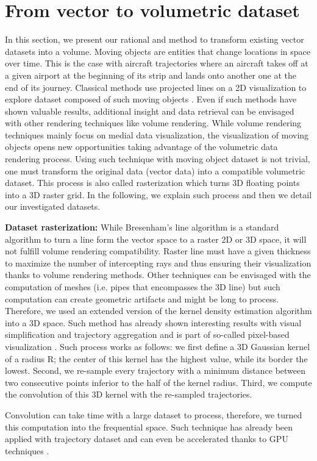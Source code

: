 \section{From vector to volumetric dataset}


In this section, we present our rational and method to transform existing vector datasets into a volume. 
Moving objects are entities that change locations in space over time. This is the case with aircraft trajectories where an aircraft takes off at a given airport at the beginning of its strip and lands onto another one at the end of its journey. Classical methods use projected lines on a 2D visualization to explore dataset composed of such moving objects \cite{hurter2014interactive}. Even if such methods have shown valuable results, additional insight and data retrieval can be envisaged with other rendering techniques like volume rendering. While volume rendering techniques mainly focus on medial data visualization, the visualization of moving objects opens new opportunities taking advantage of the volumetric data rendering process.  Using such technique with moving object dataset is not trivial, one must transform the original data (vector data) into a compatible volumetric dataset. This process is also called rasterization which turns 3D floating points into a 3D raster grid. In the following, we explain such process and then we detail our investigated datasets.

\textbf{Dataset rasterization:} While Bresenham's line algorithm is a standard algorithm to turn a line form the vector space to a raster 2D or 3D space, it will not fulfill volume rendering compatibility. Raster line must have a given thickness to maximize the number of intercepting rays and thus ensuring their visualization thanks to volume rendering methods. Other techniques can be envisaged with the computation of meshes (i.e. pipes that encompasses the 3D line) but such computation can create geometric artifacts and might be long to process. Therefore, we used an extended version of the kernel density estimation algorithm \cite{ silverman1986density} into a 3D space. Such method has already shown interesting results with visual simplification and trajectory aggregation \cite{hurter2012graph} and is part of so-called pixel-based visualization \cite{hurter2015image}.
Such process works as follows: we first define a 3D Gaussian kernel of a radius R; the center of this kernel has the highest value, while its border the lowest. Second, we re-sample every trajectory with a minimum distance between two consecutive points inferior to the half of the kernel radius. Third, we compute the convolution of this 3D kernel with the re-sampled trajectories.

Convolution can take time with a large dataset to process, therefore, we turned this computation into the frequential space. Such technique has already been applied with trajectory dataset and can even be accelerated thanks to GPU techniques \cite{lhuillier2017ffteb}.
